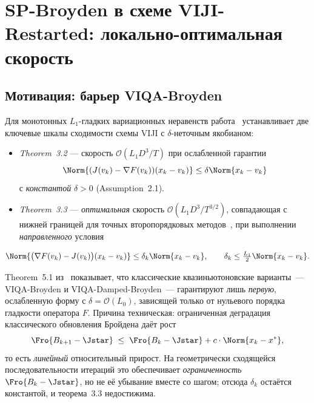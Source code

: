 
\chapter{SP-Broyden в схеме VIJI-Restarted:
         локально-оптимальная скорость}
\label{ch:sp-broyden-viji}

\section{Мотивация: барьер VIQA-Broyden}
\label{sec:viji:motivation}

Для монотонных $L_1$-гладких вариационных неравенств работа~\cite{Agafonov2024VIJI}
устанавливает две ключевые шкалы сходимости схемы VIJI с $\delta$-неточным
якобианом:

\begin{itemize}
\item \emph{Theorem~3.2} --- скорость $\mathcal O(L_1 D^3 / T)$ при ослабленной
      гарантии
      $$\Norm{(J(v_k) - \nabla F(v_k))(x_k - v_k)} \le \delta\Norm{x_k - v_k}$$
      с \emph{константой} $\delta > 0$ (Assumption~2.1).
\item \emph{Theorem~3.3} --- \emph{оптимальная} скорость
      $\mathcal O(L_1 D^3 / T^{3/2})$, совпадающая с нижней границей для
      точных второпорядковых методов~\cite{Lin2022Perseus}, при выполнении
      \emph{направленного} условия
\end{itemize}

\begin{equation}
\Norm{\big(\nabla F(v_k) - J(v_k)\big)(x_k - v_k)} \le \delta_k \Norm{x_k - v_k},
\qquad \delta_k \le \tfrac{L_1}{2}\Norm{x_k - v_k}.
\label{eq:cond14}
\end{equation}

Theorem~5.1 из~\cite{Agafonov2024VIJI} показывает, что классические
квазиньютоновские варианты~--- VIQA-Broyden и VIQA-Damped-Broyden~---
гарантируют лишь \emph{первую}, ослабленную форму с $\delta = \mathcal O(L_0)$,
зависящей только от нульевого порядка гладкости оператора $F$. Причина
техническая: ограниченная деградация классического обновления Бройдена
даёт рост
\begin{equation}
\Fro{B_{k+1} - \Jstar} \;\le\; \Fro{B_k - \Jstar} + c\cdot\Norm{x_k - x^{*}},
\label{eq:br-bd}
\end{equation}
то есть \emph{линейный} относительный прирост. На геометрически сходящейся
последовательности итераций это обеспечивает \emph{ограниченность}
$\Fro{B_k - \Jstar}$, но не её убывание вместе со шагом; отсюда $\delta_k$
остаётся константой, и теорема~3.3 недостижима.

